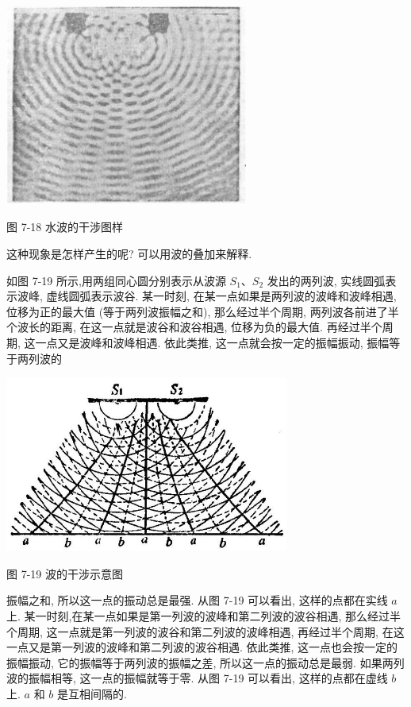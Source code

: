 \documentclass[10pt]{article}
\begin{document}
\begin{center}
\includegraphics[max width=0.6\textwidth]{images/01912d55-147c-70aa-b0e0-1782a122f948_214_585131.jpg}
\end{center}

图 7-18 水波的干涉图样

这种现象是怎样产生的呢? 可以用波的叠加来解释.

如图 7-19 所示,用两组同心圆分别表示从波源 \({S}_{1}\text{、}{S}_{2}\) 发出的两列波, 实线圆弧表示波峰, 虚线圆弧表示波谷. 某一时刻, 在某一点如果是两列波的波峰和波峰相遇, 位移为正的最大值 (等于两列波振幅之和), 那么经过半个周期, 两列波各前进了半个波长的距离, 在这一点就是波谷和波谷相遇, 位移为负的最大值. 再经过半个周期, 这一点又是波峰和波峰相遇. 依此类推, 这一点就会按一定的振幅振动, 振幅等于两列波的

\begin{center}
\includegraphics[max width=0.7\textwidth]{images/01912d55-147c-70aa-b0e0-1782a122f948_215_539633.jpg}
\end{center}

图 7-19 波的干涉示意图

振幅之和, 所以这一点的振动总是最强. 从图 7-19 可以看出, 这样的点都在实线 \(a\) 上. 某一时刻,在某一点如果是第一列波的波峰和第二列波的波谷相遇, 那么经过半个周期, 这一点就是第一列波的波谷和第二列波的波峰相遇, 再经过半个周期, 在这一点又是第一列波的波峰和第二列波的波谷相遇. 依此类推, 这一点也会按一定的振幅振动, 它的振幅等于两列波的振幅之差, 所以这一点的振动总是最弱. 如果两列波的振幅相等, 这一点的振幅就等于零. 从图 7-19 可以看出, 这样的点都在虚线 \(b\) 上. \(a\) 和 \(b\) 是互相间隔的.
\end{document}
